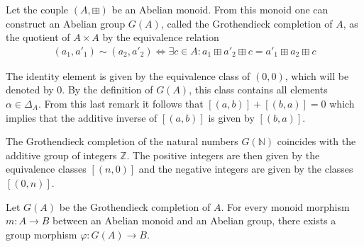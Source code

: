         
        \begin{construct}\label{group:grothendieck_completion}
		Let the couple $(A, \boxplus )$ be an Abelian monoid. From this monoid one can construct an Abelian group $G(A)$, called the Grothendieck completion of $A$, as the quotient of $A\times A$ by the equivalence relation
		\begin{gather}
			(a_1, a'_1)\sim (a_2, a'_2) \iff \exists c\in A: a_1 \boxplus a'_2 \boxplus c = a'_1 \boxplus a_2 \boxplus c
		\end{gather}
		
		The identity element is given by the equivalence class of $(0, 0)$, which will be denoted by 0. By the definition of $G(A)$, this class contains all elements $\alpha\in\Delta_A$. From this last remark it follows that $[(a, b)] + [(b, a)] = 0$ which implies that the additive inverse of $[(a, b)]$ is given by $[(b, a)]$.
        \end{construct}
        
        \begin{example}
        	The Grothendieck completion of the natural numbers $G(\mathbb{N})$ coincides with the additive group of integers $\mathbb{Z}$. The positive integers are then given by the equivalence classes $[(n, 0)]$ and the negative integers are given by the classes $[(0, n)]$.
        \end{example}
        
        \begin{uproperty}
        	Let $G(A)$ be the Grothendieck completion of $A$. For every monoid morphism $m:A\rightarrow B$ between an Abelian monoid and an Abelian group, there exists a group morphism $\varphi:G(A)\rightarrow B$.
        \end{uproperty}
        

